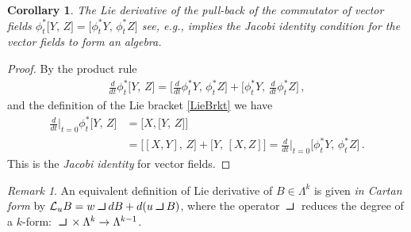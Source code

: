 \documentclass[11pt, oneside]{article}   	%
\def\contract{\makebox[1.2em][c]{\mbox{\rule{.6em}
{.01truein}\rule{.01truein}{.6em}}}}
\numberwithin{equation}{section}
\theoremstyle{plain}
\newtheorem{corollary}[theorem]{Corollary}
\theoremstyle{definition}
\theoremstyle{remark}
\newtheorem{remark}[theorem]{Remark}
\newcommand{\<}{\langle}
\renewcommand{\>}{\rangle}
\begin{document}
\begin{corollary}
The Lie derivative of the pull-back of the commutator of vector fields $\phi_t^*\big[Y,\,Z\big] = \big[\phi_t^*Y,\,\phi_t^*Z\big]$ 
see, e.g., \cite{HolmGM2025} implies the \emph{Jacobi identity} condition for the vector fields to form an algebra. 
\end{corollary}

\begin{proof}
By the product rule  
\begin{align*}
\tfrac{d}{dt}\phi_t^*\big[Y,\,Z\big] = \big[\tfrac{d}{dt}\phi_t^*Y,\,\phi_t^*Z\big] +  \big[\phi_t^*Y,\,\tfrac{d}{dt}\phi_t^*Z\big]
\,,\end{align*}
and the definition of the Lie bracket \eqref{LieBrkt} we have
\begin{align*}
\frac{d}{dt}\bigg|_{t=0}\phi^*_t\big[Y,\,Z\big]
&=
\big[X,\big[Y,\,Z\big]\big]
\\&=
\big[ [X,Y],\,Z\big] + \big[ Y,\,[X,Z]\big]
=
\frac{d}{dt}\bigg|_{t=0}\big[\phi^*_tY,\,\phi^*_t Z\big]
\,.\end{align*}
This is the \emph{Jacobi identity} for vector fields.
\end{proof}


\begin{remark}
An equivalent definition of Lie derivative of  $B\in\Lambda^k$ is given \textit{in Cartan form} by $ \mathcal{L}_uB= w\contract dB + d(u\contract B)$, where the operator 
$\contract$ reduces the degree of a $k$-form:  $\contract\times\Lambda^k \to \Lambda^{k-1}$.
\end{remark}

\end{document}
